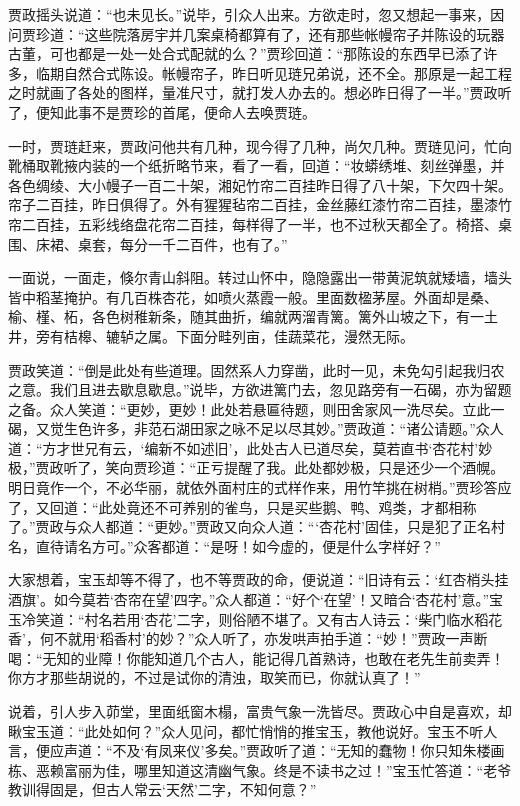 \documentclass[12pt,oneside]{book}
\begin{document}
贾政摇头说道：“也未见长。”说毕，引众人出来。方欲走时，忽又想起一事来，因问贾珍道：“这些院落房宇并几案桌椅都算有了，还有那些帐幔帘子并陈设的玩器古董，可也都是一处一处合式配就的么？”贾珍回道：“那陈设的东西早已添了许多，临期自然合式陈设。帐幔帘子，昨日听见琏兄弟说，还不全。那原是一起工程之时就画了各处的图样，量准尺寸，就打发人办去的。想必昨日得了一半。”贾政听了，便知此事不是贾珍的首尾，便命人去唤贾琏。

一时，贾琏赶来，贾政问他共有几种，现今得了几种，尚欠几种。贾琏见问，忙向靴桶取靴掖内装的一个纸折略节来，看了一看，回道：“妆蟒绣堆、刻丝弹墨，并各色绸绫、大小幔子一百二十架，湘妃竹帘二百挂昨日得了八十架，下欠四十架。帘子二百挂，昨日俱得了。外有猩猩毡帘二百挂，金丝藤红漆竹帘二百挂，墨漆竹帘二百挂，五彩线络盘花帘二百挂，每样得了一半，也不过秋天都全了。椅搭、桌围、床裙、桌套，每分一千二百件，也有了。”

一面说，一面走，倏尔青山斜阻。转过山怀中，隐隐露出一带黄泥筑就矮墙，墙头皆中稻茎掩护。有几百株杏花，如喷火蒸霞一般。里面数楹茅屋。外面却是桑、榆、槿、柘，各色树稚新条，随其曲折，编就两溜青篱。篱外山坡之下，有一土井，旁有桔槔、辘轳之属。下面分畦列亩，佳蔬菜花，漫然无际。

贾政笑道：“倒是此处有些道理。固然系人力穿凿，此时一见，未免勾引起我归农之意。我们且进去歇息歇息。”说毕，方欲进篱门去，忽见路旁有一石碣，亦为留题之备。众人笑道：“更妙，更妙！此处若悬匾待题，则田舍家风一洗尽矣。立此一碣，又觉生色许多，非范石湖田家之咏不足以尽其妙。”贾政道：“诸公请题。”众人道：“方才世兄有云，‘编新不如述旧’，此处古人已道尽矣，莫若直书‘杏花村’妙极，”贾政听了，笑向贾珍道：“正亏提醒了我。此处都妙极，只是还少一个酒幌。明日竟作一个，不必华丽，就依外面村庄的式样作来，用竹竿挑在树梢。”贾珍答应了，又回道：“此处竟还不可养别的雀鸟，只是买些鹅、鸭、鸡类，才都相称了。”贾政与众人都道：“更妙。”贾政又向众人道：“‘杏花村’固佳，只是犯了正名村名，直待请名方可。”众客都道：“是呀！如今虚的，便是什么字样好？”

大家想着，宝玉却等不得了，也不等贾政的命，便说道：“旧诗有云：‘红杏梢头挂酒旗’。如今莫若‘杏帘在望’四字。”众人都道：“好个‘在望’！又暗合‘杏花村’意。”宝玉冷笑道：“村名若用‘杏花’二字，则俗陋不堪了。又有古人诗云：‘柴门临水稻花香’，何不就用‘稻香村’的妙？”众人听了，亦发哄声拍手道：“妙！”贾政一声断喝：“无知的业障！你能知道几个古人，能记得几首熟诗，也敢在老先生前卖弄！你方才那些胡说的，不过是试你的清浊，取笑而已，你就认真了！”

说着，引人步入茆堂，里面纸窗木榻，富贵气象一洗皆尽。贾政心中自是喜欢，却瞅宝玉道︰“此处如何？”众人见问，都忙悄悄的推宝玉，教他说好。宝玉不听人言，便应声道：“不及‘有凤来仪’多矣。”贾政听了道：“无知的蠢物！你只知朱楼画栋、恶赖富丽为佳，哪里知道这清幽气象。终是不读书之过！”宝玉忙答道：“老爷教训得固是，但古人常云‘天然’二字，不知何意？”
\end{document}
